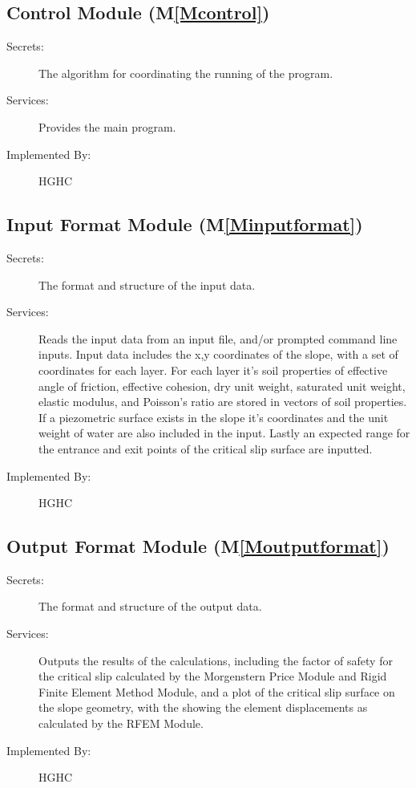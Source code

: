 \documentclass[12pt]{article}
\begin{document}
\subsection{Control Module (M\ref{Mcontrol})}
\label{Sec:CM()}
\begin{description}
\item[Secrets:]The algorithm for coordinating the running of the program.
\item[Services:]Provides the main program.
\item[Implemented By:]HGHC
\end{description}
\subsection{Input Format Module (M\ref{Minputformat})}
\label{Sec:IFM()}
\begin{description}
\item[Secrets:]The format and structure of the input data.
\item[Services:]Reads the input data from an input file, and/or prompted command line inputs. Input data includes the x,y coordinates of the slope, with a set of coordinates for each layer. For each layer it's soil properties of effective angle of friction, effective cohesion, dry unit weight, saturated unit weight, elastic modulus, and Poisson's ratio are stored in vectors of soil properties. If a piezometric surface exists in the slope it's coordinates and the unit weight of water are also included in the input. Lastly an expected range for the entrance and exit points of the critical slip surface are inputted.
\item[Implemented By:]HGHC
\end{description}
\subsection{Output Format Module (M\ref{Moutputformat})}
\label{Sec:OFM()}
\begin{description}
\item[Secrets:]The format and structure of the output data.
\item[Services:]Outputs the results of the calculations, including the factor of safety for the critical slip calculated by the Morgenstern Price Module and Rigid Finite Element Method Module, and a plot of the critical slip surface on the slope geometry, with the showing the element displacements as calculated by the RFEM Module.
\item[Implemented By:]HGHC
\end{description}
\end{document}
